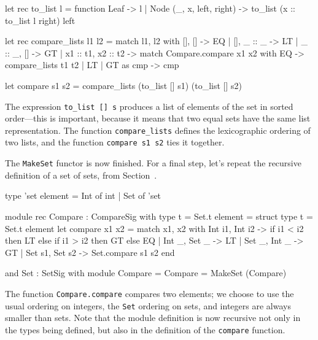 \begin{ocaml}
let rec to_list l = function
   Leaf -> l
 | Node (_, x, left, right) ->
      to_list (x :: to_list l right) left

let rec compare_lists l1 l2 =
   match l1, l2 with
      [], [] -> EQ
    | [], _ :: _ -> LT
    | _ :: _, [] -> GT
    | x1 :: t1, x2 :: t2 ->
         match Compare.compare x1 x2 with
            EQ -> compare_lists t1 t2
          | LT | GT as cmp -> cmp

let compare s1 s2 =
   compare_lists (to_list [] s1) (to_list [] s2)
\end{ocaml}
%
The expression \hbox{\lstinline$to_list [] s$} produces a list of
elements of the set in sorted order---this is important, because it
means that two equal sets have the same list representation.  The
function \hbox{\lstinline$compare_lists$} defines the lexicographic
ordering of two lists, and the function
\hbox{\lstinline$compare s1 s2$}
ties it together.

The \hbox{\lstinline$MakeSet$} functor is now finished.  For a final
step, let's repeat the recursive definition of a set of sets, from
Section~.

\begin{ocaml}
type 'set element = Int of int | Set of 'set

module rec Compare
 : CompareSig with type t = Set.t element =
struct
   type t = Set.t element
   let compare x1 x2 =
      match x1, x2 with
         Int i1, Int i2 ->
            if i1 < i2 then LT else if i1 > i2 then GT else EQ
       | Int _, Set _ -> LT
       | Set _, Int _ -> GT
       | Set s1, Set s2 -> Set.compare s1 s2
end

and Set : SetSig with module Compare = Compare = MakeSet (Compare)
\end{ocaml}
%
The function \hbox{\lstinline$Compare.compare$} compares two elements; we
choose to use the usual ordering on integers, the \hbox{\lstinline$Set$}
ordering on sets, and integers are always smaller than sets.  Note
that the module definition is now recursive not only in the types
being defined, but also in the definition of the \hbox{\lstinline$compare$}
function.

